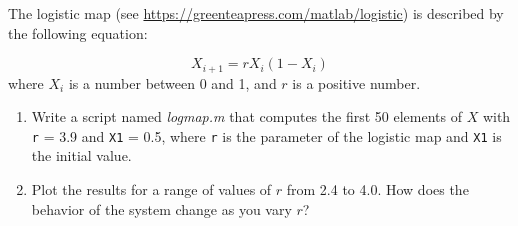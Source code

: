 \begin{ex}
The logistic map (see \url{https://greenteapress.com/matlab/logistic}) is described by the following equation:


\begin{equation*}
X_{i+1} = r X_i (1-X_i)
\end{equation*}
where $X_i$ is a number between 0 and 1, and $r$ is a positive number.

\begin{enumerate}

\item Write a script named \emph{logmap.m} that computes the first 50
elements of $X$ with \lstinline{r} = 3.9 and \lstinline{X1} = 0.5, where
\lstinline{r} is the parameter of the logistic map and \lstinline{X1} is the
initial value.

\item Plot the results for a range of values of $r$ from 2.4 to 4.0.
How does the behavior of the system change as you vary $r$?

\end{enumerate}


\end{ex}
